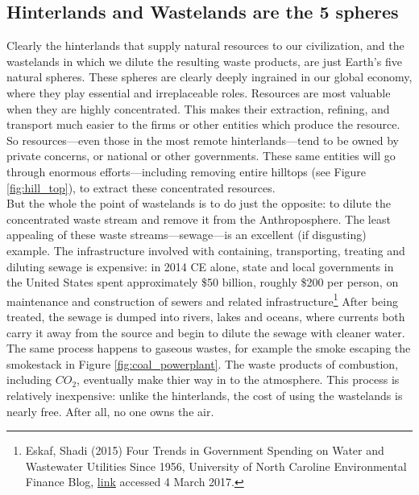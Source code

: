 \subsection{Hinterlands and Wastelands are the 5 spheres}
Clearly the hinterlands that supply natural resources to our civilization, and the wastelands in which we dilute the resulting waste products, are just Earth's five natural spheres. These spheres are clearly deeply ingrained in our global economy, where they play essential and irreplaceable roles. Resources are most valuable when they are highly concentrated. This makes their extraction, refining, and transport much easier to the firms or other entities which produce the resource. So resources---even those in the most remote hinterlands---tend to be owned by private concerns, or national or other governments. These same entities will go through enormous efforts---including removing entire hilltops (see Figure \ref{fig:hill_top}), to extract these concentrated resources. \\

But the whole the point of wastelands is to do just the opposite: to dilute the concentrated waste stream and remove it from the Anthroposphere. The least appealing of these waste streams---sewage---is an excellent (if disgusting) example. The infrastructure involved with containing, transporting, treating and diluting sewage is expensive: in 2014 CE alone, state and local governments in the United States spent approximately \$50 billion, roughly \$200 per person, on maintenance and construction of sewers and related infrastructure\footnote{Eskaf, Shadi (2015) Four Trends in Government Spending on Water and Wastewater Utilities Since 1956, University of North Caroline Environmental Finance Blog, \href{http://efc.web.unc.edu/2015/09/09/four-trends-government-spending-water/}{link} accessed 4 March 2017.} After being treated, the sewage is dumped into rivers, lakes and oceans, where currents both carry it away from the source and begin to dilute the sewage with cleaner water.\\

The same process happens to gaseous wastes, for example the smoke escaping the smokestack in Figure \ref{fig:coal_powerplant}. The waste products of combustion, including $CO_2$, eventually make thier way in to the atmosphere. This process is relatively inexpensive: unlike the hinterlands, the cost of using the wastelands is nearly free. After all, no one owns the air.\\ 

